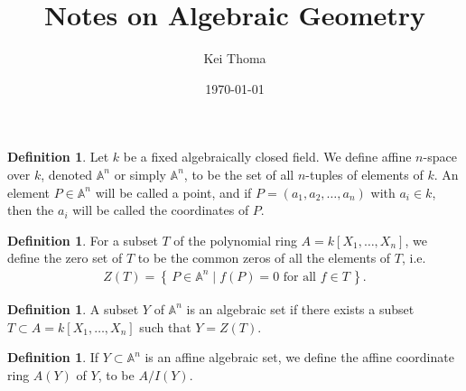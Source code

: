 \documentclass[11pt]{book}
\title{Notes on Algebraic Geometry}
\author{Kei Thoma}
\date{\today}
\theoremstyle{definition}
\newtheorem{definition}[theorem]{Definition}
\numberwithin{equation}{section}
\newcommand{\makeset}[2]{\left\{\, #1 \mathrel{\mid} #2 \,\right\}}
\begin{document}
\maketitle
\tableofcontents

\cite{hartshorne1977}

\begin{defbox}
    \begin{definition}
        Let \( k \) be a fixed algebraically closed field. We define affine \( n \)-space over \( k \), denoted \( \mathbb{A}^n \) or simply \( \mathbb{A}^n \), to be the set of all \( n \)-tuples of elements of \( k \). An element \( P \in \mathbb{A}^n \) will be called a point, and if \( P = (a_1, a_2, \ldots, a_n) \) with \( a_i \in k \), then the \( a_i \) will be called the coordinates of \( P \).
    \end{definition}
\end{defbox}

\begin{defbox}
    \begin{definition}
        For a subset \(T\) of the polynomial ring \(A = k[X_1, \ldots, X_n]\), we define the zero set of \(T\) to be the common zeros of all the elements of \(T\), i.e.
        \begin{align*}
            Z(T) = \makeset{P \in \mathbb{A}^n}{f(P) = 0 \text{ for all } f \in T} \text{.}
        \end{align*}
    \end{definition}
\end{defbox}

\begin{defbox}
    \begin{definition}
        A subset \(Y\) of \(\mathbb{A}^n\) is an algebraic set if there exists a subset \(T \subset A = k[X_1, \ldots, X_n]\) such that \(Y = Z(T)\).
    \end{definition}
\end{defbox}

\begin{defbox}
    \begin{definition}
        \label{def:affine_coordinate_ring}
        If \(Y \subset \mathbb{A}^n\) is an affine algebraic set, we define the affine coordinate ring \(A(Y)\) of \(Y\), to be \(A / I(Y)\). 
    \end{definition}
\end{defbox}
\end{document}
